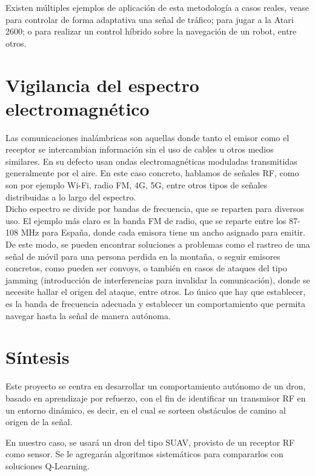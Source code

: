 Existen múltiples ejemplos de aplicación de esta metodología a casos reales, vease para controlar de forma adaptativa una señal de tráfico; para jugar a la Atari 2600; o para realizar un control híbrido sobre la navegación de un robot, entre otros. \cite{q-learning-app}\\

\section{Vigilancia del espectro electromagnético}
\label{subsec:señales}

Las comunicaciones inalámbricas son aquellas donde tanto el emisor como el receptor se intercambian información sin el uso de cables u otros medios similares. En su defecto usan ondas electromagnéticas moduladas transmitidas generalmente por el aire. En este caso concreto, hablamos de señales \ac{RF}, como son por ejemplo Wi-Fi, radio FM, 4G, 5G, entre otros tipos de señales distribuidas a lo largo del espectro.\\

Dicho espectro se divide por bandas de frecuencia, que se reparten para diversos uso. El ejemplo más claro es la banda FM de radio, que se reparte entre los 87-108 MHz para España, donde cada emisora tiene un ancho asignado para emitir. \cite{bandw}\\

De este modo, se pueden encontrar soluciones a problemas como el rastreo de una señal de móvil para una persona perdida en la montaña, o seguir emisores concretos, como pueden ser convoys, o también en casos de ataques del tipo jamming (introducción de interferencias para invalidar la comunicación), donde se necesite hallar el origen del ataque, entre otros. Lo único que hay que establecer, es la banda de frecuencia adecuada y establecer un comportamiento que permita navegar hasta la señal de manera autónoma.\\

\section{Síntesis}
\label{subsec:sintesis}

Este proyecto se centra en desarrollar un comportamiento autónomo de un dron, basado en aprendizaje por refuerzo, con el fin de identificar un transmisor \ac{RF} en un entorno dinámico, es decir, en el cual se sorteen obstáculos de camino al origen de la señal.


En nuestro caso, se usará un dron del tipo \ac{SUAV}, provisto de un receptor \ac{RF} como sensor. Se le agregarán algoritmos sistemáticos para compararlos con soluciones Q-Learning.